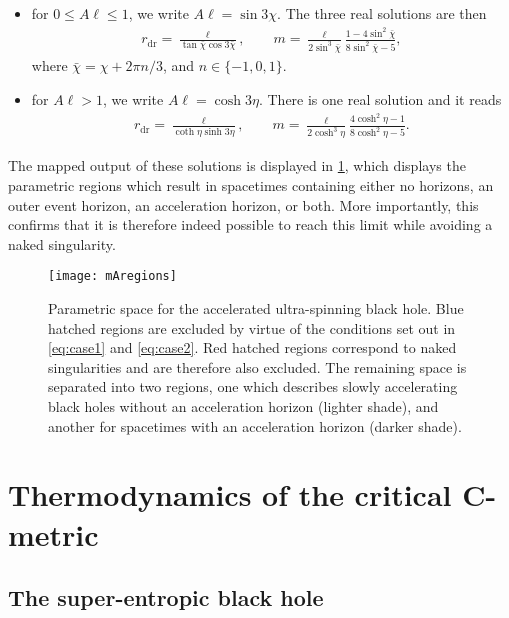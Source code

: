 \documentclass[
twoside,openright,frontopenright]{dmathesis}
\newcommand{\dr}{\mathrm{dr}}
\begin{document}
\begin{itemize}
\item for $0\leqslant A\ell \leqslant 1$, we write $A\ell=\sin 3\chi$. The three
  real solutions are then
\begin{align}
r_\dr = \frac{\ell}{\tan\bar{\chi}\cos3\bar{\chi}}, \qquad m =
  \frac{\ell}{2\sin^3\bar{\chi}}\frac{1-4\sin^2\bar{\chi}}{8\sin^2\bar{\chi}-5},
\end{align}
where $\bar{\chi} = \chi + 2\pi n/3$, and $n \in \{-1,0,1\}$.
\item for $A\ell > 1$, we write $A\ell=\cosh 3\eta$. There is one real solution
  and it reads
\begin{align}
r_\dr = \frac{\ell}{\coth\eta\sinh 3\eta}, \qquad m =
  \frac{\ell}{2\cosh^3\eta}\frac{4\cosh^2\eta-1}{8\cosh^2\eta-5}. 
\end{align}
\end{itemize}

The mapped output of these solutions is displayed in \cref{fig:horroots}, which
displays the parametric regions which result in spacetimes containing either no
horizons, an outer event horizon, an acceleration horizon, or both. More
importantly, this confirms that it is therefore indeed possible to reach this
limit while avoiding a naked singularity.
 
\begin{figure}\centering
\texttt{[image: mAregions]}
\hspace{-170pt}
\caption{\label{fig:horroots}Parametric space for the accelerated ultra-spinning
black hole. Blue hatched regions are excluded by virtue of the conditions set
out in \cref{eq:case1} and \cref{eq:case2}. Red hatched regions correspond to
naked singularities and are therefore also excluded. The remaining space is
separated into two regions, one which describes slowly accelerating black holes
without an acceleration horizon (lighter shade), and another for spacetimes with
an acceleration horizon (darker shade).}
\end{figure}

\section{Thermodynamics of the critical C-metric}

\subsection{The super-entropic black hole}
\label{sec:uskerr}
\end{document}
